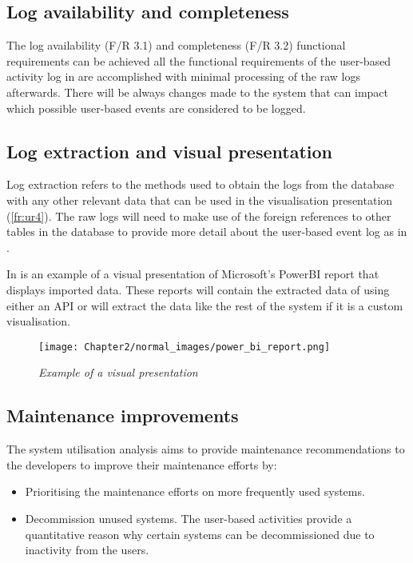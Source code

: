 \subsection{Log availability and completeness}\label{sec:ch2_log_Availability}
The log availability (F/R 3.1) and completeness (F/R 3.2) functional requirements can be achieved all the functional requirements of the user-based activity log in  are accomplished with minimal processing of the raw logs afterwards. There will be always changes made to the system that can impact which possible user-based events are considered to be logged.

\subsection{Log extraction and visual presentation}\label{sec:ch2_logExtraction}
Log extraction refers to the methods used to obtain the logs from the database with any other relevant data that can be used in the visualisation presentation (\ref{fr:ur4}). The raw logs will need to make use of the foreign references to other tables in the database to provide more detail about the user-based event log as in .\par In  is an example of a visual presentation of Microsoft's PowerBI report that displays imported data. These reports will contain the extracted data of  using either an API or will extract the data like the rest of the system if it is a custom visualisation.

\begin{figure}[!htb] %
	\centering %
	\texttt{[image: Chapter2/normal\_images/power\_bi\_report.png]}
	\caption[Example of a visual presentation]
	{\textit{Example of a visual presentation}}\label{fig:ch2_pbiExample}
\end{figure}

\subsection{Maintenance improvements}\label{sec:ch2_utilisationImprovements}
The system utilisation analysis aims to provide maintenance recommendations to the developers to improve their maintenance efforts by:

\begin{itemize}
	\item Prioritising the maintenance efforts on more frequently used systems.
	\item Decommission unused systems. The user-based activities provide a quantitative reason why certain systems can be decommissioned due to inactivity from the users.
\end{itemize}

